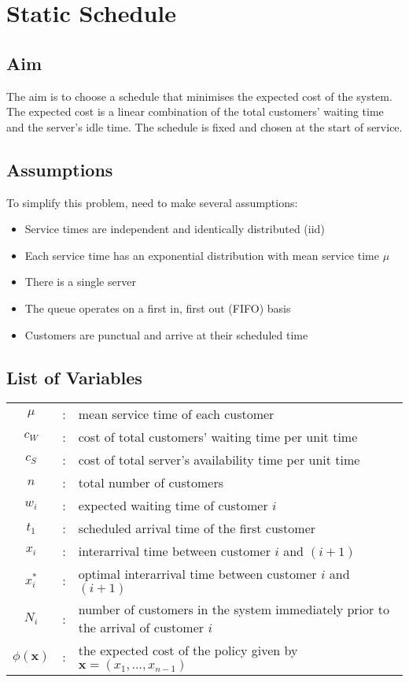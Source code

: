\chapter{Static Schedule}
\section{Aim}
The aim is to choose a schedule that minimises the expected cost of the system. The expected cost is a linear combination of the total customers' waiting time and the server's idle time. The schedule is fixed and chosen at the start of service.

\section{Assumptions}
To simplify this problem, need to make several assumptions:
\begin{itemize}[nosep]
	\item Service times are independent and identically distributed (iid)
	\item Each service time has an exponential distribution with mean service time $\mu$
	\item There is a single server
	\item The queue operates on a first in, first out (FIFO) basis
	\item Customers are punctual and arrive at their scheduled time
\end{itemize}

\section{List of Variables}
\begin{tabularx}{\textwidth}{c c X}
	$\mu$ & : & mean service time of each customer \\
	$c_{W}$ & : & cost of total customers' waiting time per unit time \\
	$c_{S}$ & : & cost of total server's availability time per unit time \\
	$n$ & : & total number of customers \\
	$w_{i}$ & : & expected waiting time of customer $i$ \\
	$t_{1}$ & : & scheduled arrival time of the first customer \\
	$x_{i}$ & : & interarrival time between customer $i$ and $(i + 1)$ \\
	$x_{i}^{*}$ & : & optimal interarrival time between customer $i$ and $(i + 1)$ \\
	$N_{i}$ & : & number of customers in the system immediately prior to the arrival of customer $i$ \\
	$\phi (\mathbf{x})$ & : & the expected cost of the policy given by $\mathbf{x} = (x_{1}, \ldots, x_{n - 1})$
\end{tabularx}

